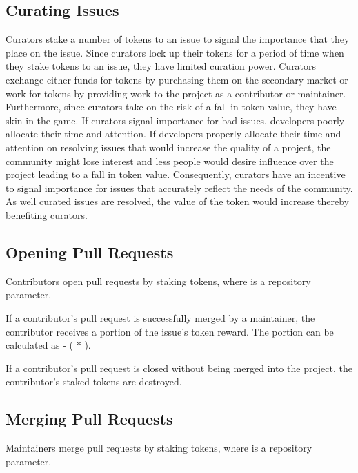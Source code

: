 \subsection{Curating Issues}

Curators stake a number of tokens to an issue to signal the importance that they
place on the issue. Since curators lock up their tokens for a period of time
when they stake tokens to an issue, they have limited curation power. Curators exchange either funds for tokens by purchasing them
on the secondary market or work for tokens by providing work to the project as a
contributor or maintainer. Furthermore, since curators take on the risk of a
fall in token value, they have skin in the game\cite{skininthegame}. If curators
signal importance for bad issues, developers poorly allocate their time and
attention. If developers properly allocate their time and attention on resolving
issues that would increase the quality of a project, the community might lose
interest and less people would desire influence over the project leading to a
fall in token value. Consequently, curators have an incentive to signal
importance for issues that accurately reflect the needs of the community. As
well curated issues are resolved, the value of the token would increase thereby
benefiting curators.

\subsection{Opening Pull Requests}

Contributors open pull requests by staking  tokens,
where  is a repository parameter.

If a contributor's pull request is successfully merged by a maintainer, the
contributor receives a portion of the issue's token reward. The portion can be
calculated as  - ( $*$ ).

If a contributor's pull request is closed without being merged into the project,
the contributor's  staked tokens are destroyed.

\subsection{Merging Pull Requests}
\label{sec:merge}

Maintainers merge pull requests by staking  tokens,
where  is a repository parameter.

